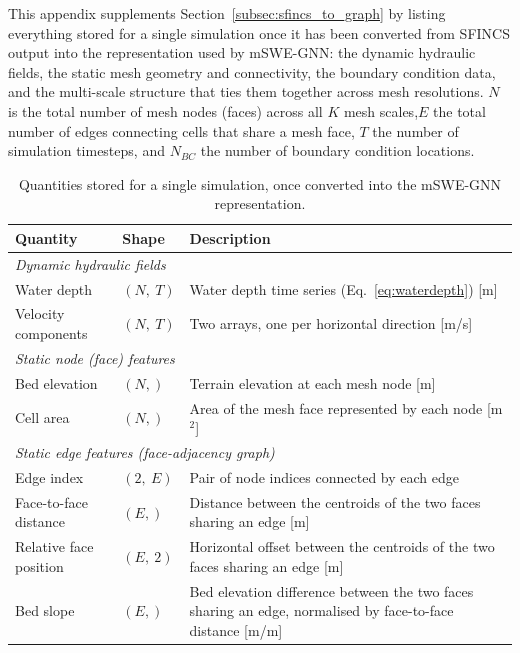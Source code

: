 \documentclass[12pt,a4paper]{report}
\begin{document}
{This appendix supplements Section~\ref{subsec:sfincs_to_graph} by listing everything
stored for a single simulation once it has been converted from SFINCS output into the
representation used by mSWE-GNN: the dynamic hydraulic fields, the static mesh geometry
and connectivity, the boundary condition data, and the multi-scale structure that ties
them together across mesh resolutions. $N$ is the total number of mesh nodes (faces)
across all $K$ mesh scales,$E$ the total number of edges connecting cells that
share a mesh face, $T$ the number of simulation timesteps, and
$N_{BC}$ the number of boundary condition locations.

\begin{table}[H]
    \centering
    \caption{Quantities stored for a single simulation, once converted into the
      mSWE-GNN representation.}
    \label{tab:app-sim-data}
    \small
    \renewcommand{\arraystretch}{0.9}
    \begin{tabular}{p{4cm}p{2.3cm}p{7.2cm}}
        \toprule
        \textbf{Quantity} & \textbf{Shape} & \textbf{Description} \\
        \midrule
        \multicolumn{3}{l}{\emph{Dynamic hydraulic fields}} \\
        Water depth & $(N,\ T)$ & Water depth time series (Eq.~\ref{eq:waterdepth}) [m] \\
        Velocity components & $(N,\ T)$ & Two arrays, one per horizontal direction [m/s] \\
        \midrule
        \multicolumn{3}{l}{\emph{Static node (face) features}} \\
        Bed elevation & $(N,)$ & Terrain elevation at each mesh node [m] \\
        Cell area & $(N,)$ & Area of the mesh face represented by each node [m$^2$] \\
        \midrule
        \multicolumn{3}{l}{\emph{Static edge features (face-adjacency graph)}} \\
        Edge index & $(2,\ E)$ & Pair of node indices connected by each edge \\
        Face-to-face distance & $(E,)$ & Distance between the centroids of the two faces sharing an edge [m] \\
        Relative face position & $(E,\ 2)$ & Horizontal offset between the centroids of the two faces sharing an edge [m] \\
        Bed slope & $(E,)$ & Bed elevation difference between the two faces sharing an edge, normalised by face-to-face distance [m/m] \\

\end{tabular}
\end{table}}
\end{document}

